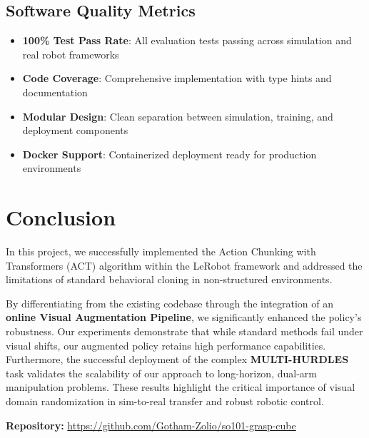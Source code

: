 \documentclass[10pt]{article} %
\begin{document}
\subsection{Software Quality Metrics}

\begin{itemize}
    \item \textbf{100\% Test Pass Rate}: All evaluation tests passing across simulation and real robot frameworks
    \item \textbf{Code Coverage}: Comprehensive implementation with type hints and documentation
    \item \textbf{Modular Design}: Clean separation between simulation, training, and deployment components
    \item \textbf{Docker Support}: Containerized deployment ready for production environments
\end{itemize}

\section{Conclusion}

In this project, we successfully implemented the Action Chunking with Transformers (ACT) algorithm within the LeRobot framework and addressed the limitations of standard behavioral cloning in non-structured environments. 

By differentiating from the existing codebase through the integration of an \textbf{online Visual Augmentation Pipeline}, we significantly enhanced the policy's robustness. Our experiments demonstrate that while standard methods fail under visual shifts, our augmented policy retains high performance capabilities. Furthermore, the successful deployment of the complex \textbf{MULTI-HURDLES} task validates the scalability of our approach to long-horizon, dual-arm manipulation problems. These results highlight the critical importance of visual domain randomization in sim-to-real transfer and robust robotic control.

\vspace{1em}
\textbf{Repository:} \url{https://github.com/Gotham-Zolio/so101-grasp-cube}
\end{document}
